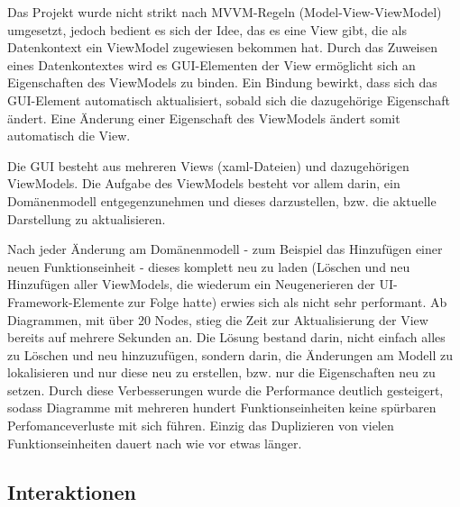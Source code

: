 Das Projekt wurde nicht strikt nach MVVM-Regeln (Model-View-ViewModel) 
umgesetzt, jedoch bedient es sich der Idee, das es eine View gibt, die
als Datenkontext ein ViewModel zugewiesen bekommen hat. Durch das Zuweisen eines
Datenkontextes wird es GUI-Elementen der View ermöglicht sich an Eigenschaften des ViewModels zu
binden. Ein Bindung bewirkt, dass sich das GUI-Element automatisch aktualisiert,
sobald sich die dazugehörige Eigenschaft ändert. Eine Änderung einer
Eigenschaft des ViewModels ändert somit automatisch die View.

Die GUI besteht aus mehreren Views (xaml-Dateien) und dazugehörigen ViewModels.
Die Aufgabe des ViewModels besteht vor allem darin, ein Domänenmodell entgegenzunehmen und dieses
darzustellen, bzw. die aktuelle Darstellung zu aktualisieren.

Nach jeder Änderung am Domänenmodell - zum Beispiel das Hinzufügen einer neuen
Funktionseinheit -  dieses komplett neu zu laden (Löschen und neu Hinzufügen aller
ViewModels, die wiederum ein Neugenerieren der UI-Framework-Elemente zur
Folge hatte) erwies sich als nicht sehr performant. 
Ab Diagrammen, mit über 20 Nodes, stieg die Zeit zur Aktualisierung der View
bereits auf mehrere Sekunden an.
Die Lösung bestand darin, nicht einfach alles zu Löschen und neu
hinzuzufügen, sondern darin, die Änderungen am Modell zu lokalisieren und nur
diese neu zu erstellen, bzw. nur die Eigenschaften neu zu setzen. Durch
diese Verbesserungen wurde die Performance deutlich gesteigert, sodass
Diagramme mit mehreren hundert Funktionseinheiten keine spürbaren Perfomanceverluste mit
sich führen. Einzig das Duplizieren von vielen Funktionseinheiten dauert nach wie vor
etwas länger. 

\subsection{Interaktionen}

